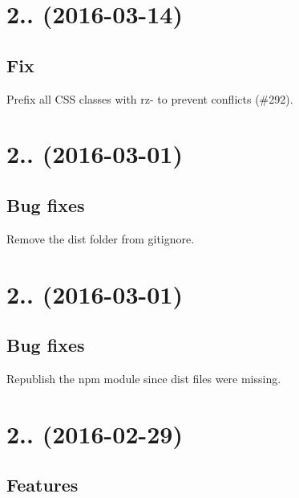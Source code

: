 \section*{2.. (2016-\/03-\/14)}

\subsection*{Fix}


\begin{DoxyItemize}
\item Prefix all C\+SS classes with rz-\/ to prevent conflicts (\#292).
\end{DoxyItemize}

\section*{2.. (2016-\/03-\/01)}

\subsection*{Bug fixes}


\begin{DoxyItemize}
\item Remove the dist folder from gitignore.
\end{DoxyItemize}

\section*{2.. (2016-\/03-\/01)}

\subsection*{Bug fixes}


\begin{DoxyItemize}
\item Republish the npm module since dist files were missing.
\end{DoxyItemize}

\section*{2.. (2016-\/02-\/29)}

\subsection*{Features}


